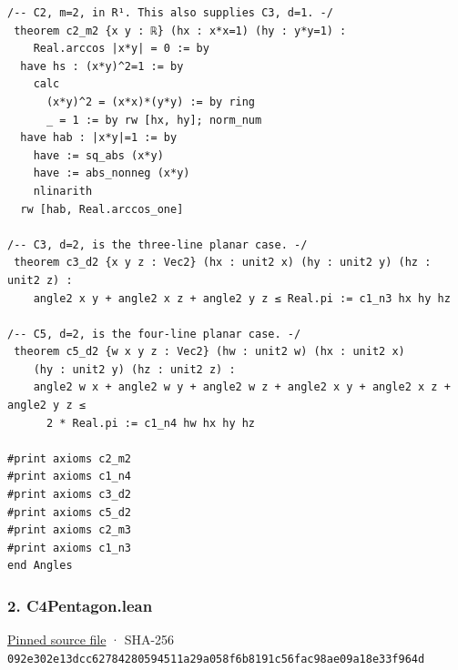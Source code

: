 \documentclass[11pt,a4paper]{article}
\begin{document}
\begin{Verbatim}[breaklines,breakanywhere,fontsize=\footnotesize]
/-- C2, m=2, in R¹. This also supplies C3, d=1. -/
 theorem c2_m2 {x y : ℝ} (hx : x*x=1) (hy : y*y=1) :
    Real.arccos |x*y| = 0 := by
  have hs : (x*y)^2=1 := by
    calc
      (x*y)^2 = (x*x)*(y*y) := by ring
      _ = 1 := by rw [hx, hy]; norm_num
  have hab : |x*y|=1 := by
    have := sq_abs (x*y)
    have := abs_nonneg (x*y)
    nlinarith
  rw [hab, Real.arccos_one]

/-- C3, d=2, is the three-line planar case. -/
 theorem c3_d2 {x y z : Vec2} (hx : unit2 x) (hy : unit2 y) (hz : unit2 z) :
    angle2 x y + angle2 x z + angle2 y z ≤ Real.pi := c1_n3 hx hy hz

/-- C5, d=2, is the four-line planar case. -/
 theorem c5_d2 {w x y z : Vec2} (hw : unit2 w) (hx : unit2 x)
    (hy : unit2 y) (hz : unit2 z) :
    angle2 w x + angle2 w y + angle2 w z + angle2 x y + angle2 x z + angle2 y z ≤
      2 * Real.pi := c1_n4 hw hx hy hz

#print axioms c2_m2
#print axioms c1_n4
#print axioms c3_d2
#print axioms c5_d2
#print axioms c2_m3
#print axioms c1_n3
end Angles
\end{Verbatim}

\subsubsection{2. C4Pentagon.lean}\label{c4pentagon.lean}

\href{https://github.com/mpelteshki/climbing-to-the-frontier/blob/29fbb70da18564048f62492e43870f2f96a65463/cagent/p1/C4Pentagon.lean}{Pinned source file} · SHA-256 \texttt{092e302e\allowbreak{}13dcc627\allowbreak{}84280594\allowbreak{}511a29a0\allowbreak{}58f6b819\allowbreak{}1c56fac9\allowbreak{}8ae09a18\allowbreak{}e33f964d}
\end{document}

